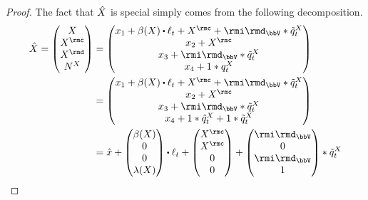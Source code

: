 \begin{proof}
  \label{proof:proposition:joint-characteristics}
  The fact that $\hat{X}$ is special simply comes from the following decomposition.
  \begin{align*}
    \hat\X 
    = \begin{pmatrix}
      \X \\ \X^\rmc \\ \X^\rmd \\ \N^\X 
    \end{pmatrix}  
    &= \begin{pmatrix} 
      \stateVar_1 + \affDrift(\X) \shortInt \leb_t + \X^\rmc + \id_\vecSpace \ast \compensate{\jumpMeas^\X}_t \\ \stateVar_2 + \X^\rmc \\ \stateVar_3 + \id_\vecSpace \ast \compensate{\jumpMeas^\X}_t  \\ \stateVar_4 + 1 \ast \jumpMeas^\X_t
    \end{pmatrix}  \\
    &= \begin{pmatrix} 
      \stateVar_1 + \affDrift(\X) \shortInt \leb_t + \X^\rmc + \id_\vecSpace \ast \compensate{\jumpMeas^\X}_t \\ \stateVar_2 + \X^\rmc \\ \stateVar_3 + \id_\vecSpace \ast \compensate{\jumpMeas^\X}_t  \\ \stateVar_4 + 1 \ast \predproj{\jumpMeas^\X}_t + 1 \ast \compensate{\jumpMeas^\X}_t
    \end{pmatrix}  \\
    &= \hat\stateVar 
    + \begin{pmatrix} 
      \affDrift(\X) \\
      0 \\
      0 \\
      \affInt(\X)
    \end{pmatrix} \shortInt \leb_t
    + \begin{pmatrix}
      \X^\rmc \\
      \X^\rmc \\
      0 \\
      0
    \end{pmatrix}
    + \begin{pmatrix}
      \id_\vecSpace \\
      0 \\
      \id_\vecSpace \\
      1 
    \end{pmatrix} \ast \compensate{\jumpMeas^\X}_t

\end{align*}
\end{proof}
